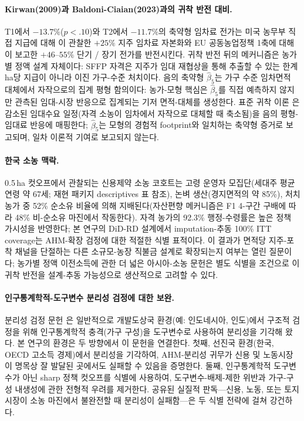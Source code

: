 \documentclass[12pt, a4paper]{article}
\begin{document}
\paragraph{Kirwan(2009)과 Baldoni-Ciaian(2023)과의 귀착 반전 대비.} T1에서 $-13.7\%$($p < .10$)와 T2에서 $-11.7\%$의 축약형 임차료 전가는 미국 농무부 직접 지급에 대해 \citet{Kirwan2009_rentcap}이 관찰한 $+25\%$ 지주 임차료 자본화와 EU 공동농업정책 1축에 대해 \citet{BaldoniCiaian2023_eucap}이 보고한 $+46$--$55\%$ 단기 / 장기 전가를 반전시킨다. 귀착 반전 뒤의 메커니즘은 농가별 정액 설계 자체이다: SFFP 자격은 지주가 임대 재협상을 통해 추출할 수 있는 한계 ha당 지급이 아니라 이진 가구-수준 처치이다. 음의 축약형 $\hat\beta_5$는 가구 수준 임차면적 대체에서 자작으로의 집계 평형 함의이다: 농가-모형 핵심은 $\hat\beta_5$를 직접 예측하지 않지만 관측된 임대-시장 반응으로 집계되는 기저 면적-대체를 생성한다. 표준 귀착 이론 \citep{Floyd1965_incidence, AlstonJames2002_incidence}은 감소된 임대수요 일정(자격 소농이 임차에서 자작으로 대체할 때 축소됨)을 음의 평형-임대료 반응에 매핑한다; $\hat\beta_5$는 모형의 경험적 footprint와 일치하는 축약형 증거로 보고되며, 일차 이론적 기여로 보고되지 않는다.

\paragraph{한국 소농 맥락.} 0.5\,ha 컷오프에서 관찰되는 신용제약 소농 코호트는 고령 운영자 모집단(세대주 평균 연령 약 67세; 재현 패키지 descriptives 표 참조), 논벼 생산(경지면적의 약 85\%), 처치 농가 중 52\% 순소유 비율에 의해 지배된다(자산편향 메커니즘은 F1 4-구간 구배에 따라 48\% 비-순소유 마진에서 작동한다). 자격 농가의 92.3\% 행정-수령률은 높은 정책 가시성을 반영한다; 본 연구의 DiD-RD 설계에서 imputation-추동 100\% ITT coverage는 AHM-확장 검정에 대한 적절한 식별 표적이다. 이 결과가 면적당 지주-포착 채널을 단절하는 다른 소규모-농장 직불금 설계로 확장되는지 여부는 열린 질문이다; 농가별 정액 이전소득에 관한 더 넓은 아시아-소농 문헌은 별도 식별을 조건으로 이 귀착 반전을 설계-추동 가능성으로 생산적으로 고려할 수 있다.

\paragraph{인구통계학적-도구변수 분리성 검정에 대한 보완.} 분리성 검정 문헌 \citep{Benjamin1992_separation, LaFaveThomas2016_markets}은 일반적으로 개발도상국 환경(예: 인도네시아, 인도)에서 구조적 검정을 위해 인구통계학적 충격(가구 구성)을 도구변수로 사용하여 분리성을 기각해 왔다. 본 연구의 환경은 두 방향에서 이 문헌을 연결한다. 첫째, 선진국 환경(한국, OECD 고소득 경제)에서 분리성을 기각하여, AHM-분리성 귀무가 신용 및 노동시장이 명목상 잘 발달된 곳에서도 실패할 수 있음을 증명한다. 둘째, 인구통계학적 도구변수가 아닌 sharp 정책 컷오프를 식별에 사용하여, 도구변수-배제-제한 위반과 가구-구성 내생성에 관한 전형적 우려를 제거한다. 공유된 실질적 판독---신용, 노동, 또는 토지시장이 소농 마진에서 불완전할 때 분리성이 실패함---은 두 식별 전략에 걸쳐 강건하다.
\end{document}
